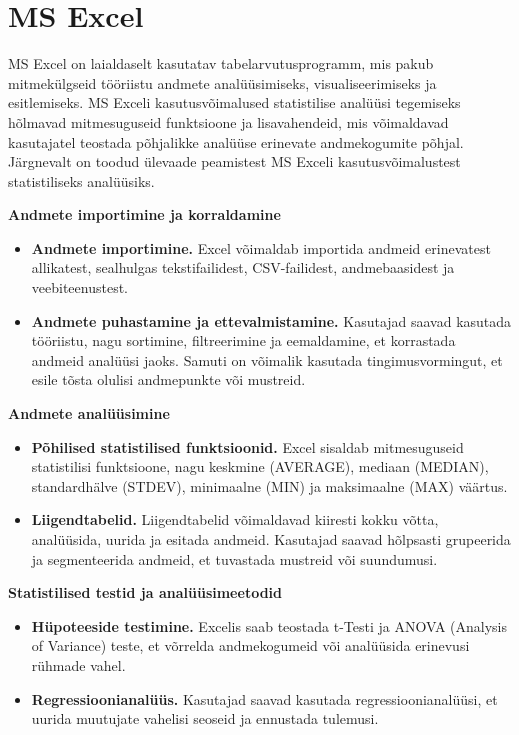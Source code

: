 \documentclass[
]{book}
\providecommand{\tightlist}{%
  \setlength{\itemsep}{0pt}\setlength{\parskip}{0pt}}
\begin{document}
\section{MS Excel}\label{ms-excel}

MS Excel on laialdaselt kasutatav tabelarvutusprogramm, mis pakub mitmekülgseid tööriistu andmete analüüsimiseks, visualiseerimiseks ja esitlemiseks. MS Exceli kasutusvõimalused statistilise analüüsi tegemiseks hõlmavad mitmesuguseid funktsioone ja lisavahendeid, mis võimaldavad kasutajatel teostada põhjalikke analüüse erinevate andmekogumite põhjal. Järgnevalt on toodud ülevaade peamistest MS Exceli kasutusvõimalustest statistiliseks analüüsiks.

\textbf{Andmete importimine ja korraldamine}

\begin{itemize}
\tightlist
\item
  \textbf{Andmete importimine.} Excel võimaldab importida andmeid erinevatest allikatest, sealhulgas tekstifailidest, CSV-failidest, andmebaasidest ja veebiteenustest.
\item
  \textbf{Andmete puhastamine ja ettevalmistamine.} Kasutajad saavad kasutada tööriistu, nagu sortimine, filtreerimine ja eemaldamine, et korrastada andmeid analüüsi jaoks. Samuti on võimalik kasutada tingimusvormingut, et esile tõsta olulisi andmepunkte või mustreid.
\end{itemize}

\textbf{Andmete analüüsimine}

\begin{itemize}
\tightlist
\item
  \textbf{Põhilised statistilised funktsioonid.} Excel sisaldab mitmesuguseid statistilisi funktsioone, nagu keskmine (AVERAGE), mediaan (MEDIAN), standardhälve (STDEV), minimaalne (MIN) ja maksimaalne (MAX) väärtus.
\item
  \textbf{Liigendtabelid.} Liigendtabelid võimaldavad kiiresti kokku võtta, analüüsida, uurida ja esitada andmeid. Kasutajad saavad hõlpsasti grupeerida ja segmenteerida andmeid, et tuvastada mustreid või suundumusi.
\end{itemize}

\textbf{Statistilised testid ja analüüsimeetodid}

\begin{itemize}
\tightlist
\item
  \textbf{Hüpoteeside testimine.} Excelis saab teostada t-Testi ja ANOVA (Analysis of Variance) teste, et võrrelda andmekogumeid või analüüsida erinevusi rühmade vahel.
\item
  \textbf{Regressioonianalüüs.} Kasutajad saavad kasutada regressioonianalüüsi, et uurida muutujate vahelisi seoseid ja ennustada tulemusi.
\end{itemize}
\end{document}
